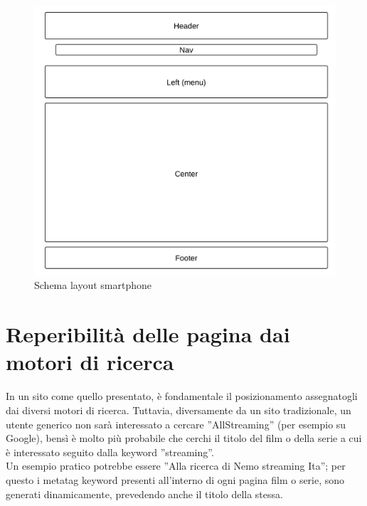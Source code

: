 \begin{itemize}
\begin{center}
\begin{figure}[H]
\centering
\includegraphics[scale=0.55]{images/smartLayout.png}
\caption{Schema layout smartphone}
\end{figure}
\end{center}

\end{itemize}



\section{Reperibilità delle pagina dai motori di ricerca}

In un sito come quello presentato, è fondamentale il posizionamento assegnatogli dai diversi motori di ricerca. Tuttavia, diversamente da un sito tradizionale, un utente generico non sarà interessato a cercare ''AllStreaming'' (per esempio su Google), bensì è molto più probabile che cerchi il titolo del film o della serie a cui è interessato seguito dalla keyword ''streaming''.\\ 
Un esempio pratico potrebbe essere ''Alla ricerca di Nemo streaming Ita''; per questo i metatag keyword presenti all'interno di ogni pagina film o serie, sono generati dinamicamente, prevedendo anche il titolo della stessa.


